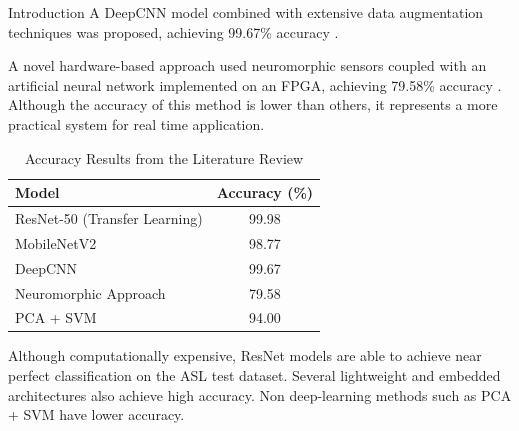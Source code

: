 \documentclass[12pt, a4paper]{article}
\begin{document}
\begin{section}{Introduction}
    A DeepCNN model combined with extensive data augmentation techniques was proposed, achieving 99.67\% accuracy \cite{ncbi2022deepcnn}.
    
    A novel hardware-based approach used neuromorphic sensors coupled with an artificial neural network implemented on an FPGA, achieving 79.58\% accuracy \cite{mdpi2017neuromorphic}. Although the accuracy of this method is lower than others, it represents a more practical system for real time application.
    
    \begin{table}[H]
    \centering
    \caption{Accuracy Results from the Literature Review}
    \label{tab:litreview}
    \begin{tabular}{|l|c|}
    \hline
    Model & Accuracy (\%) \\
    \hline
    ResNet-50 (Transfer Learning) \cite{mdpi2023resnet} & 99.98 \\
    MobileNetV2 \cite{techscience2022mobilenet} & 98.77 \\
    DeepCNN \cite{ncbi2022deepcnn} & 99.67 \\
    Neuromorphic Approach \cite{mdpi2017neuromorphic} & 79.58 \\
    PCA + SVM \cite{mdpi2023resnet} & 94.00 \\
    \hline
    \end{tabular}
    \end{table}
    Although computationally expensive, ResNet models are able to achieve near perfect classification on the ASL test dataset. Several lightweight and embedded architectures also achieve high accuracy. Non deep-learning methods such as PCA + SVM have lower accuracy.

\end{section}
\end{document}

